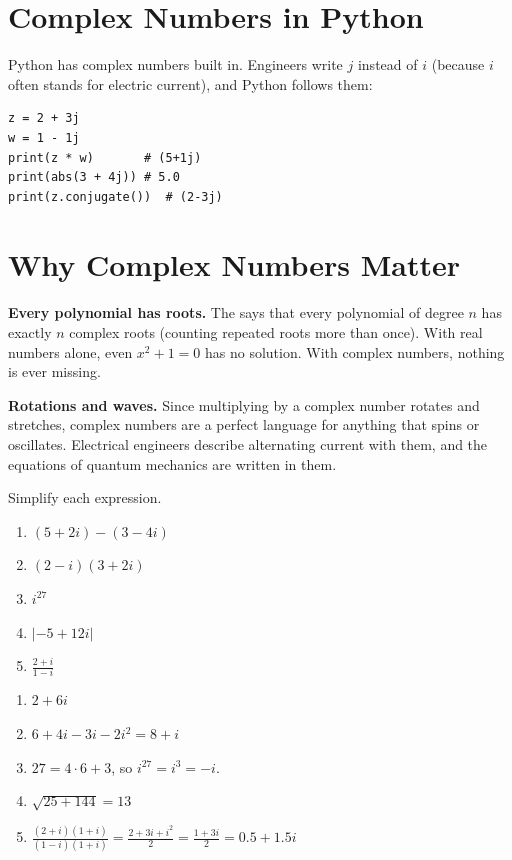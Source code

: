 \section{Complex Numbers in Python}

Python has complex numbers built in. Engineers write $j$ instead of $i$
(because $i$ often stands for electric current), and Python follows them:
\begin{verbatim}
z = 2 + 3j
w = 1 - 1j
print(z * w)       # (5+1j)
print(abs(3 + 4j)) # 5.0
print(z.conjugate())  # (2-3j)
\end{verbatim}

\section{Why Complex Numbers Matter}

\textbf{Every polynomial has roots.} The  says that every polynomial
of degree $n$ has exactly $n$ complex roots (counting repeated roots more
than once). With real numbers alone, even $x^2 + 1 = 0$ has no solution.
With complex numbers, nothing is ever missing.

\textbf{Rotations and waves.} Since multiplying by a complex number rotates
and stretches, complex numbers are a perfect language for anything that
spins or oscillates. Electrical engineers describe alternating current with
them, and the equations of quantum mechanics are written in them.

\begin{Exercise}[title={Practice}, label=cx2]
Simplify each expression.
\begin{enumerate}
\item $(5 + 2i) - (3 - 4i)$
\item $(2 - i)(3 + 2i)$
\item $i^{27}$
\item $|-5 + 12i|$
\item $\frac{2 + i}{1 - i}$
\end{enumerate}
\end{Exercise}
\begin{Answer}[ref=cx2]
\begin{enumerate}
\item $2 + 6i$
\item $6 + 4i - 3i - 2i^2 = 8 + i$
\item $27 = 4 \cdot 6 + 3$, so $i^{27} = i^3 = -i$.
\item $\sqrt{25 + 144} = 13$
\item $\frac{(2 + i)(1 + i)}{(1 - i)(1 + i)} = \frac{2 + 3i + i^2}{2} = \frac{1 + 3i}{2} = 0.5 + 1.5i$
\end{enumerate}
\end{Answer}

